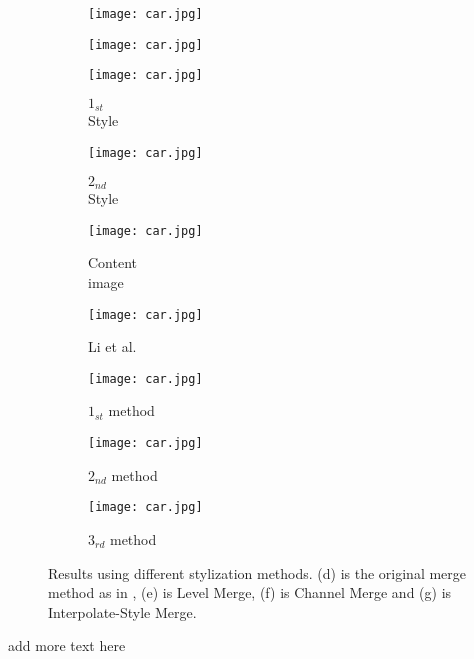 \begin{figure}[H]
\begin{subfigure}[b]{0.13\linewidth}
	\end{subfigure}
	\begin{subfigure}[b]{0.13\linewidth}
		\texttt{[image: car.jpg]} %
	\end{subfigure}
	\begin{subfigure}[b]{0.13\linewidth}
		\texttt{[image: car.jpg]} %
	\end{subfigure}
	\centering
	\begin{subfigure}[b]{0.13\linewidth}
		\texttt{[image: car.jpg]} %
		\caption{$1_{st}$ \\ Style}
	\end{subfigure}
	\begin{subfigure}[b]{0.13\linewidth}
		\texttt{[image: car.jpg]} %
		\caption{$2_{nd}$ \\ Style}
	\end{subfigure}
	\begin{subfigure}[b]{0.13\linewidth}
		\texttt{[image: car.jpg]} %
		\caption{Content \\ image}
	\end{subfigure}
	\begin{subfigure}[b]{0.13\linewidth}
		\texttt{[image: car.jpg]} %
		\caption{Li et al. \cite{bib11}}
	\end{subfigure}
	\begin{subfigure}[b]{0.13\linewidth}
		\texttt{[image: car.jpg]} %
		\caption{$1_{st}$ method}
	\end{subfigure}
	\begin{subfigure}[b]{0.13\linewidth}
		\texttt{[image: car.jpg]} %
		\caption{$2_{nd}$ method}
	\end{subfigure}
	\begin{subfigure}[b]{0.13\linewidth}
		\texttt{[image: car.jpg]} %
		\caption{$3_{rd}$ method}
	\end{subfigure}
		\caption{Results using different stylization methods. (d) is the original merge method as in \cite{bib11}, (e) is Level Merge, (f) is Channel Merge and (g) is Interpolate-Style Merge.}
		\label{fig:Merge}
\end{figure}
add more text here
